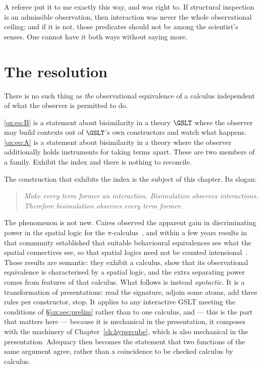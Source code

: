 A referee put it to me exactly this way, and was right to. If structural
inspection is an admissible observation, then interaction was never the whole
observational ceiling; and if it is not, those predicates should not be among the
scientist's senses. One cannot have it both ways without saying more.

\section{The resolution}
\label{ox:sec:resolution}

There is no such thing as \emph{the} observational equivalence of a calculus
independent of what the observer is permitted to do.

\eqref{ox:eq:B} is a statement about bisimilarity in a theory $\GSLT$ where the
observer may build contexts out of $\GSLT$'s own constructors and watch what
happens. \eqref{ox:eq:A} is a statement about bisimilarity in a theory where the
observer additionally holds instruments for taking terms apart. These are two
members of a family. Exhibit the index and there is nothing to reconcile.

The construction that exhibits the index is the subject of this chapter. Its
slogan:

\begin{quote}
\itshape
Make every term former an interaction. Bisimulation observes interactions.
Therefore bisimulation observes every term former.
\end{quote}

The phenomenon is not new. Caires observed the apparent gain in discriminating
power in the spatial logic for the $\pi$-calculus~\cite{Caires,CairesCardelli},
and within a few years results in that community established that suitable
behavioural equivalences see what the spatial connectives see, so that spatial
logics need not be counted intensional~\cite{Lozes,HirschkoffLozes}. Those results are semantic: they exhibit
a calculus, show that its observational equivalence is characterised by a spatial
logic, and the extra separating power comes from features of that calculus. What
follows is instead \emph{syntactic}. It is a transformation of presentations: read
the signature, adjoin some atoms, add three rules per constructor, stop. It applies
to any interactive GSLT meeting the conditions of \S\ref{ox:sec:prelim} rather than
to one calculus, and --- this is the part that matters here --- because it is
mechanical in the presentation, it composes with the machinery of
Chapter~\ref{ch:hypercube}, which is also mechanical in the presentation.
Adequacy then becomes the statement that two functions of the same argument agree,
rather than a coincidence to be checked calculus by calculus.


